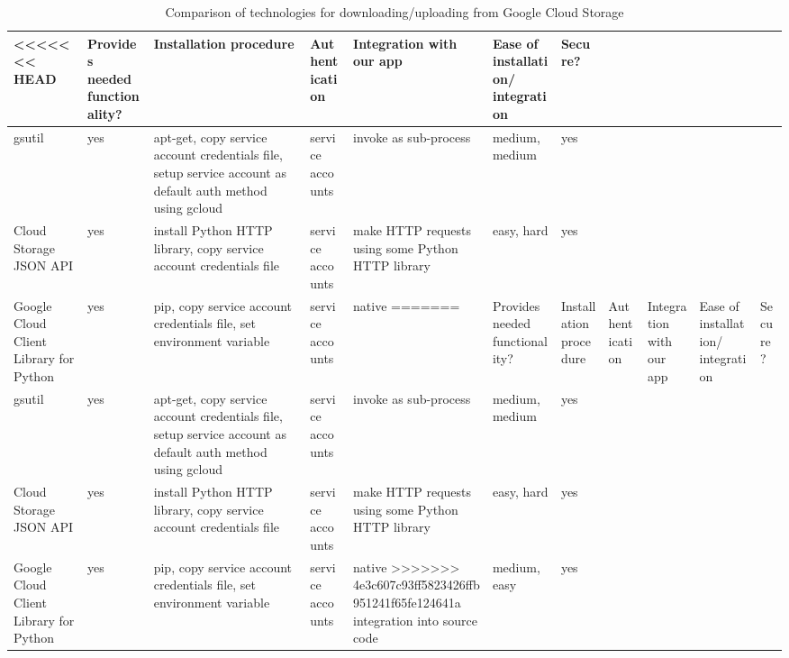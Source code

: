 \documentclass[10pt, onecolumn, draftclsnofoot, letterpaper, compsoc]{IEEEtran}
\begin{document}
\begin{table}[h]
\centering
\caption{Comparison of technologies for downloading/uploading from Google Cloud Storage}
\begin{tabular}{|p{1.8cm}|p{1.4cm}|p{3cm}|p{1.8cm}|p{1.8cm}|p{1.8cm}|p{1cm}|}
\hline

<<<<<<< HEAD
 & Provides needed functionality? & Installation procedure & Authentication
 & Integration with our app & Ease of installation/ integration & Secure? \\ \hline

gsutil & yes & apt-get, copy service account credentials file, setup service
account as default auth method using gcloud & service accounts & invoke as
sub-process & medium, medium & yes \\ \hline

Cloud Storage JSON API & yes & install Python HTTP library, copy service
account credentials file & service accounts & make HTTP requests using
some Python HTTP library & easy, hard & yes \\ \hline

Google Cloud Client Library for Python & yes & pip, copy service account
credentials file, set environment variable & service accounts & native
=======
 & Provides needed functionality? & Installation procedure & Authentication
 & Integration with our app & Ease of installation/ integration & Secure? \\ \hline

gsutil & yes & apt-get, copy service account credentials file, setup service
account as default auth method using gcloud & service accounts & invoke as
sub-process & medium, medium & yes \\ \hline

Cloud Storage JSON API & yes & install Python HTTP library, copy service
account credentials file & service accounts & make HTTP requests using
some Python HTTP library & easy, hard & yes \\ \hline

Google Cloud Client Library for Python & yes & pip, copy service account
credentials file, set environment variable & service accounts & native
>>>>>>> 4e3c607c93ff5823426ffb951241f65fe124641a
integration into source code & medium, easy & yes \\ \hline

\end{tabular}
\label{table:bret1}
\end{table}
\end{document}
